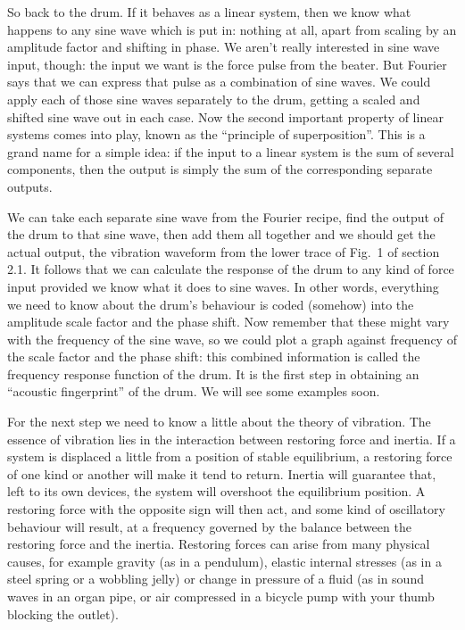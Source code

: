   So back to the drum. If it behaves as a linear system, then we know what 
  happens to any sine wave which is put in: nothing at all, apart from scaling 
  by an amplitude factor and shifting in phase. We aren't really interested in 
  sine wave input, though: the input we want is the force pulse from the 
  beater. But Fourier says that we can express that pulse as a combination of 
  sine waves. We could apply each of those sine waves separately to the drum, 
  getting a scaled and shifted sine wave out in each case. Now the second 
  important property of linear systems comes into play, known as the 
  ``principle of superposition''. This is a grand name for a simple idea: if 
  the input to a linear system is the sum of several components, then the 
  output is simply the sum of the corresponding separate outputs. 

  We can take each separate sine wave from the Fourier recipe, find the output 
  of the drum to that sine wave, then add them all together and we should get 
  the actual output, the vibration waveform from the lower trace of Fig.\ 1 of 
  section 2.1. It follows that we can calculate the response of the drum to any 
  kind of force input provided we know what it does to sine waves. In other 
  words, everything we need to know about the drum's behaviour is coded 
  (somehow) into the amplitude scale factor and the phase shift. Now remember 
  that these might vary with the frequency of the sine wave, so we could plot a 
  graph against frequency of the scale factor and the phase shift: this 
  combined information is called the frequency response function of the drum. 
  It is the first step in obtaining an ``acoustic fingerprint'' of the drum. We 
  will see some examples soon. 

  For the next step we need to know a little about the theory of vibration. The 
  essence of vibration lies in the interaction between restoring force and 
  inertia. If a system is displaced a little from a position of stable 
  equilibrium, a restoring force of one kind or another will make it tend to 
  return. Inertia will guarantee that, left to its own devices, the system will 
  overshoot the equilibrium position. A restoring force with the opposite sign 
  will then act, and some kind of oscillatory behaviour will result, at a 
  frequency governed by the balance between the restoring force and the 
  inertia. Restoring forces can arise from many physical causes, for example 
  gravity (as in a pendulum), elastic internal stresses (as in a steel spring 
  or a wobbling jelly) or change in pressure of a fluid (as in sound waves in 
  an organ pipe, or air compressed in a bicycle pump with your thumb blocking 
  the outlet). 

